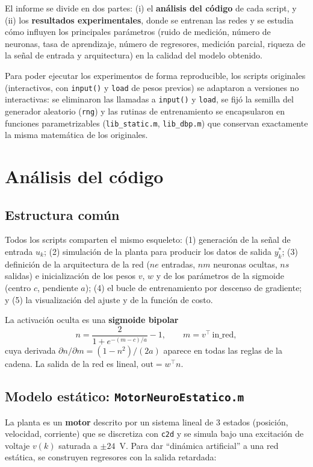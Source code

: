 \documentclass[11pt,a4paper]{article}
\newcommand{\code}[1]{\texttt{\small #1}}
\begin{document}
El informe se divide en dos partes: (i) el \textbf{análisis del código} de cada script,
y (ii) los \textbf{resultados experimentales}, donde se entrenan las redes y se estudia
cómo influyen los principales parámetros (ruido de medición, número de neuronas, tasa de
aprendizaje, número de regresores, medición parcial, riqueza de la señal de entrada y
arquitectura) en la calidad del modelo obtenido.

Para poder ejecutar los experimentos de forma reproducible, los scripts originales
(interactivos, con \code{input()} y \code{load} de pesos previos) se adaptaron a
versiones no interactivas: se eliminaron las llamadas a \code{input()}
y \code{load}, se fijó la semilla del generador aleatorio (\code{rng}) y las rutinas de
entrenamiento se encapsularon en funciones parametrizables (\code{lib\_static.m},
\code{lib\_dbp.m}) que conservan exactamente la misma matemática de los originales.

\section{Análisis del código}

\subsection{Estructura común}

Todos los scripts comparten el mismo esqueleto: (1) generación de la señal de entrada
$u_k$; (2) simulación de la planta para producir los datos de salida $y^*_k$;
(3) definición de la arquitectura de la red ($ne$ entradas, $nm$ neuronas ocultas,
$ns$ salidas) e inicialización de los pesos $v$, $w$ y de los parámetros de la sigmoide
(centro $c$, pendiente $a$); (4) el bucle de entrenamiento por descenso de gradiente; y
(5) la visualización del ajuste y de la función de costo.

La activación oculta es una \textbf{sigmoide bipolar}
\[
  n = \frac{2}{1+e^{-(m-c)/a}}-1, \qquad m = v^{\top}\,\text{in\_red},
\]
cuya derivada $\partial n/\partial m = (1-n^2)/(2a)$ aparece en todas las reglas de la
cadena. La salida de la red es lineal, $\text{out}=w^{\top}n$.

\subsection{Modelo estático: \texttt{MotorNeuroEstatico.m}}

La planta es un \textbf{motor} descrito por un sistema lineal de 3 estados
(posición, velocidad, corriente) que se discretiza con \code{c2d} y se simula bajo una
excitación de voltaje $v(k)$ saturada a $\pm 24$~V. Para dar ``dinámica artificial'' a
una red estática, se construyen regresores con la salida retardada:
\end{document}
